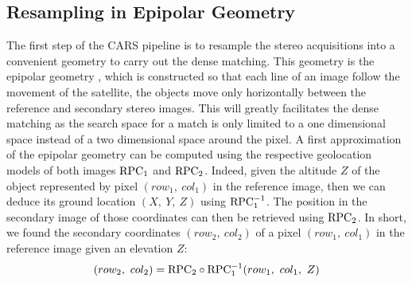 \subsection{Resampling in Epipolar Geometry}\label{sec:epipolar_geometry}
The first step of the CARS pipeline is to resample the stereo acquisitions into a convenient geometry to carry out the dense matching. This geometry is the epipolar geometry \cite{cnes_imagerie_2008}, which is constructed so that each line of an image follow the movement of the satellite, \ie the objects move only horizontally between the reference and secondary stereo images. This will greatly facilitates the dense matching as the search space for a match is only limited to a one dimensional space instead of a two dimensional space around the pixel. A first approximation of the epipolar geometry can be computed using the respective geolocation models of both images $\mathrm{RPC}_1$ and $\mathrm{RPC}_2$. Indeed, given the altitude $Z$ of the object represented by pixel $(row_1, ~col_1)$ in the reference image, then we can deduce its ground location $(X, ~Y, ~Z)$ using $\mathrm{RPC}_1^{-1}$. The position in the secondary image of those coordinates can then be retrieved using $\mathrm{RPC}_2$. In short, we found the secondary coordinates $(row_2,~col_2)$ of a pixel $(row_1,~col_1)$ in the reference image given an elevation $Z$: 
\begin{equation}
    (row_2,~col_2) = \mathrm{RPC}_2\circ\mathrm{RPC}_1^{-1}(row_1, ~col_1, ~Z)\label{eq:epipolar_transfer}
\end{equation}
